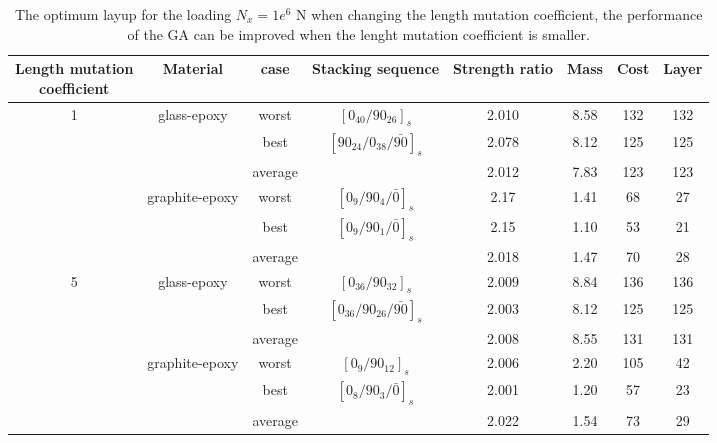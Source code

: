 \renewcommand{\arraystretch}{1.0}
\begin{table}
\caption{The optimum layup for the loading $N_x=1e^6$ N when changing the
length mutation coefficient, the performance of the GA can be improved
when the lenght mutation coefficient is smaller.} 
\begin{adjustbox}{width=1\textwidth}
	\begin{tabular}{cccccccc}
	\toprule
	\makecell{Length mutation \\ coefficient}		     &	 Material		               	 & case     & Stacking sequence    & Strength ratio  & Mass  &  Cost   & Layer    \\ 
	\midrule																															  
	\multirow{6}{*}{1} &	\multirow{3}{*}{glass-epoxy}   	 & worst     &  $[0_{40}/90_{26}]_s$ & 2.010           &  8.58  & 132     & 132   \\
					   &								     & best      &  $[90_{24}/0_{38}/\bar{90}]_s$ & 2.078  &  8.12  & 125     & 125  \\
					     &									 & average   &    		           & 2.012           &  7.83  & 123     & 123  \\
						 &	\multirow{3}{*}{graphite-epoxy}	 & worst     &  $[0_{9}/90_{4}/\bar{0}]_s$ & 2.17             & 1.41   & 68      & 27      \\
					     &								     & best      &  $[0_{9}/90_{1}/\bar{0}]_s$  & 2.15           & 1.10   & 53      & 21      \\
					     &								     & average   &                     & 2.018           & 1.47   & 70      & 28      \\ 
	\multirow{6}{*}{5} &	\multirow{3}{*}{glass-epoxy}   	 & worst     &  $[0_{36}/90_{32}]_s$ &  2.009          & 8.84   &  136    &  136   \\
					   &								     & best      &  $[0_{36}/90_{26}/\bar{90}]_s$ &  2.003          & 8.12   &  125    &  125   \\
					     &									 & average   &                     &  2.008          & 8.55   &  131    &  131  \\
						 &	\multirow{3}{*}{graphite-epoxy}	 & worst     &  $[0_{9}/90_{12}]_s$ &  2.006          & 2.20   &  105    &  42  \\
						 &								     & best      &  $[0_{8}/90_{3}/\bar{0}]_s$  &  2.001          & 1.20   &  57     &  23  \\
					     &								     & average   &                    &   2.022          & 1.54   &  73     &  29  \\
	\bottomrule																															  
\end{tabular}
\end{adjustbox}
\label{tab:optimum_layup}
\end{table}
            
            

